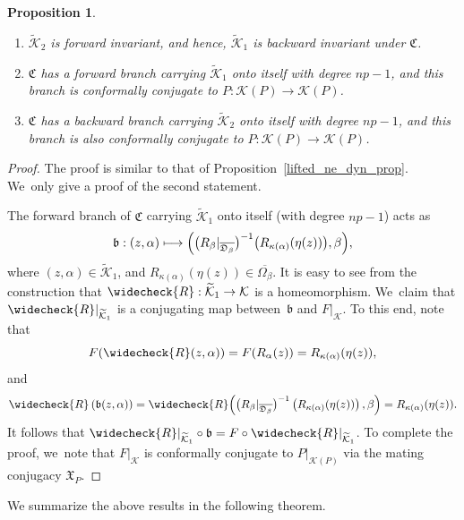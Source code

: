 \documentclass[JEP,XML,SOM,Unicode,NoFloatCountersInSection,published]{cedram}
\def\mto{\mathchoice{\longmapsto}{\mapsto}{\mapsto}{\mapsto}}
\newtheorem{proposition}[lemma]{Proposition}
\theoremstyle{definition}
\theoremstyle{remark}
\newcommand{\cK}{\mathcal{K}}
\begin{document}
\skpt
\begin{proposition}\label{lifted_ne_dyn_gen_prop}
\begin{enumerate}
\item $\widetilde{\mathcal{K}}_2$ is forward invariant, and hence, $\widetilde{\mathcal{K}}_1$ is backward invariant under $\mathfrak{C}$.

\item $\mathfrak{C}$ has a forward branch carrying $\widetilde{\mathcal{K}}_1$ onto itself with degree $np-1$, and this branch is conformally conjugate to $P:\cK(P)\to\cK(P)$.

\item $\mathfrak{C}$ has a backward branch carrying $\widetilde{\mathcal{K}}_2$ onto itself with degree $np-1$, and this branch is also conformally conjugate to $P:\cK(P)\to\cK(P)$.
\end{enumerate}
\end{proposition}
\begin{proof}
The proof is similar to that of Proposition~\ref{lifted_ne_dyn_prop}. We~only give a proof of the second statement.

The forward branch of $\mathfrak{C}$ carrying $\widetilde{\mathcal{K}}_1$ onto itself (with degree $np-1$) acts as
\[
\mathfrak{b}: \left(z,\alpha\right)\mto \Bigl(\bigl(R_{\beta}\vert_{\overline{\mathfrak{D}_{\beta}}}\bigr)^{-1}\bigl(R_{\kappa(\alpha)}(\eta(z))\bigr),\beta\Bigr),
\]
where $(z,\alpha)\in\widetilde{\mathcal{K}}_1$, and $R_{\kappa(\alpha)}(\eta(z))\in\overline{\Omega_\beta}$.
It is easy to see from the construction that $\widecheck{R}:\widetilde{\mathcal{K}}_1\to \mathcal{K}$ is a homeomorphism. We~claim that $\widecheck{R}\vert_{\widetilde{\mathcal{K}}_1}$ is a conjugating map between~$\mathfrak{b}$ and $F\vert_{\cK}$. To this end, note that
\[
F(\widecheck{R}(z,\alpha))=F(R_\alpha(z))=R_{\kappa(\alpha)}(\eta(z)),
\]
and
\[
\widecheck{R}\left(\mathfrak{b}(z,\alpha)\right)=\widecheck{R}\Bigl(\bigl(R_{\beta}\vert_{\overline{\mathfrak{D}_{\beta}}}\bigr)^{-1}\left(R_{\kappa(\alpha)}(\eta(z))\right),\beta\Bigr)=R_{\kappa(\alpha)}(\eta(z)).
\]
It follows that $\widecheck{R}\vert_{\widetilde{\mathcal{K}}_1}\circ\mathfrak{b}=F\circ\widecheck{R}\vert_{\widetilde{\mathcal{K}}_1}$. To complete the proof, we~note that $F\vert_{\cK}$ is conformally conjugate to $P\vert_{\cK(P)}$ via the mating conjugacy $\mathfrak{X}_P$.
\end{proof}

We summarize the above results in the following theorem.
\end{document}
